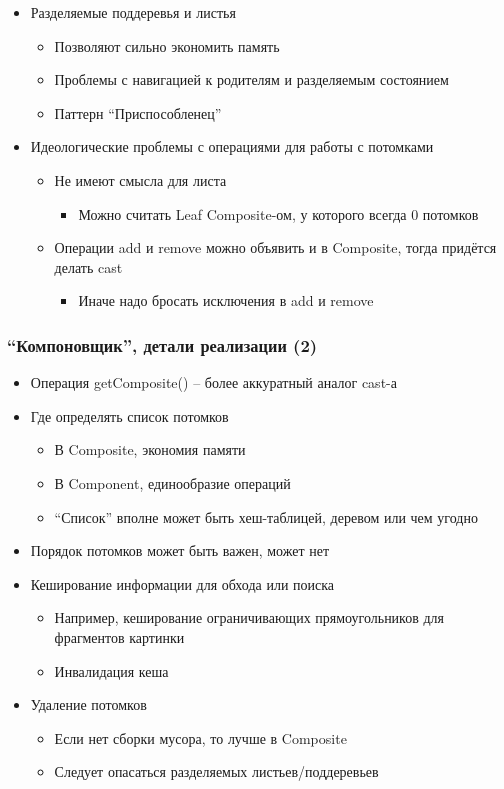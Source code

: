 \documentclass[xetex,mathserif,serif]{beamer}
\begin{document}
\begin{frame}
		\begin{itemize}
			\item Разделяемые поддеревья и листья
			\begin{itemize}
				\item Позволяют сильно экономить память
				\item Проблемы с навигацией к родителям и разделяемым состоянием
				\item Паттерн ``Приспособленец''
			\end{itemize}
			\item Идеологические проблемы с операциями для работы с потомками
			\begin{itemize}
				\item Не имеют смысла для листа
				\begin{itemize}
					\item Можно считать Leaf Composite-ом, у которого всегда 0 потомков
				\end{itemize}
				\item Операции add и remove можно объявить и в Composite, тогда придётся делать cast
				\begin{itemize}
					\item Иначе надо бросать исключения в add и remove
				\end{itemize}
			\end{itemize}
		\end{itemize}
	\end{frame}

	\begin{frame}
		\frametitle{``Компоновщик'', детали реализации (2)}
		\begin{itemize}
			\item Операция getComposite() – более аккуратный аналог cast-а
			\item Где определять список потомков
			\begin{itemize}
				\item В Composite, экономия памяти
				\item В Component, единообразие операций
				\item ``Список'' вполне может быть хеш-таблицей, деревом или чем угодно
			\end{itemize}
			\item Порядок потомков может быть важен, может нет
			\item Кеширование информации для обхода или поиска
			\begin{itemize}
				\item Например, кеширование ограничивающих прямоугольников для фрагментов картинки
				\item Инвалидация кеша
			\end{itemize}
			\item Удаление потомков
			\begin{itemize}
				\item Если нет сборки мусора, то лучше в Composite
				\item Следует опасаться разделяемых листьев/поддеревьев
			\end{itemize}
		\end{itemize}
	\end{frame}
\end{document}
